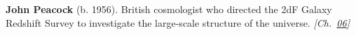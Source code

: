 \textbf{John Peacock} (b. 1956). British cosmologist who directed the 2dF Galaxy Redshift Survey to investigate the large-scale structure of the universe. \emph{[Ch.~\hyperref[ch:gravitytimedilation]{06}]}

